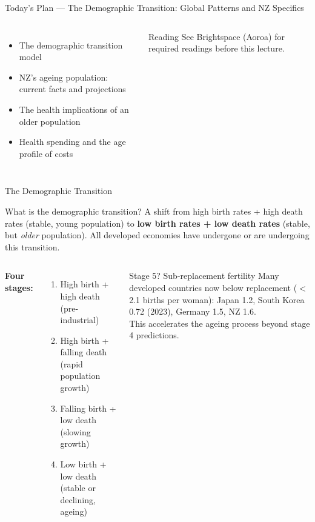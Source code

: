 \documentclass[aspectratio=169, 12pt]{beamer}
\newcommand{\planslide}[2]{%
  \begin{frame}{Today's Plan — #1}
    \begin{columns}
      \column{0.6\textwidth}
      \begin{itemize}#2\end{itemize}
      \column{0.38\textwidth}
      \begin{alertblock}{Reading}
        \footnotesize See Brightspace (Aoroa) for required readings before this lecture.
      \end{alertblock}
    \end{columns}
  \end{frame}}
\begin{document}
\planslide{The Demographic Transition: Global Patterns and NZ Specifics}{
  \item The demographic transition model
  \item NZ's ageing population: current facts and projections
  \item The health implications of an older population
  \item Health spending and the age profile of costs
}

\begin{frame}{The Demographic Transition}
  \begin{block}{What is the demographic transition?}
    A shift from high birth rates + high death rates (stable, young population) to
    \textbf{low birth rates + low death rates} (stable, but \emph{older} population).
    All developed economies have undergone or are undergoing this transition.
  \end{block}
  \vspace{0.3em}
  \begin{columns}
      \textbf{Four stages:}
      \begin{enumerate}
        \item High birth + high death (pre-industrial)
        \item High birth + falling death (rapid population growth)
        \item Falling birth + low death (slowing growth)
        \item Low birth + low death (stable or declining, ageing)
      \end{enumerate}
      \begin{alertblock}{Stage 5? Sub-replacement fertility}
        Many developed countries now below replacement ($<$2.1 births per woman): Japan 1.2,
        South Korea 0.72 (2023), Germany 1.5, NZ 1.6.\\[0.3em]
        This accelerates the ageing process beyond stage 4 predictions.
      \end{alertblock}
  \end{columns}
\end{frame}
\end{document}
